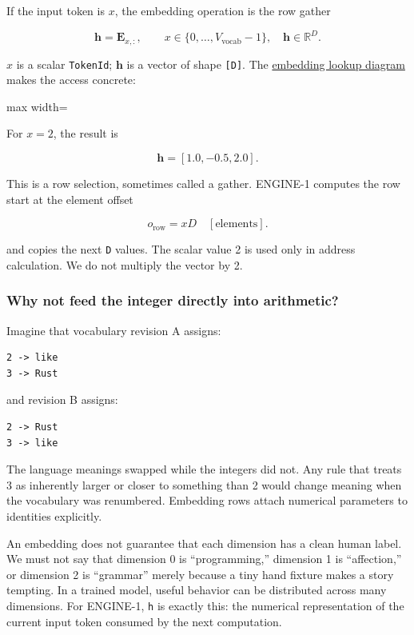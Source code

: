 \documentclass[
  10pt,
]{article}
\begin{document}
If the input token is \(x\), the embedding operation is the row gather

\[
\mathbf{h}=\mathbf{E}_{x,:},
\qquad x\in\{0,\ldots,V_{\mathrm{vocab}}-1\},
\quad \mathbf{h}\in\mathbb{R}^{D}.
\]

\(x\) is a scalar \texttt{TokenId}; \(\mathbf{h}\) is a vector of shape
\texttt{{[}D{]}}. The
\href{https://github.com/hermonai/inside-the-llm-engine/blob/astra-visual-rewrite/diagrams/model/embedding-row-lookup.txt}{embedding
lookup diagram} makes the access concrete:

\begin{center}\begin{adjustbox}{max width=\linewidth}\end{adjustbox}\end{center}

For \(x=2\), the result is

\[
\mathbf{h}=[1.0,-0.5,2.0].
\]

This is a row selection, sometimes called a gather. ENGINE-1 computes
the row start at the element offset

\[
o_{\mathrm{row}}=xD\quad[\mathrm{elements}].
\]

and copies the next \texttt{D} values. The scalar value 2 is used only
in address calculation. We do not multiply the vector by 2.

\subsubsection{Why not feed the integer directly into
arithmetic?}\label{why-not-feed-the-integer-directly-into-arithmetic}

Imagine that vocabulary revision A assigns:

\begin{verbatim}
2 -> like
3 -> Rust
\end{verbatim}

and revision B assigns:

\begin{verbatim}
2 -> Rust
3 -> like
\end{verbatim}

The language meanings swapped while the integers did not. Any rule that
treats 3 as inherently larger or closer to something than 2 would change
meaning when the vocabulary was renumbered. Embedding rows attach
numerical parameters to identities explicitly.

An embedding does not guarantee that each dimension has a clean human
label. We must not say that dimension 0 is ``programming,'' dimension 1
is ``affection,'' or dimension 2 is ``grammar'' merely because a tiny
hand fixture makes a story tempting. In a trained model, useful behavior
can be distributed across many dimensions. For ENGINE-1, \texttt{h} is
exactly this: the numerical representation of the current input token
consumed by the next computation.
\end{document}
